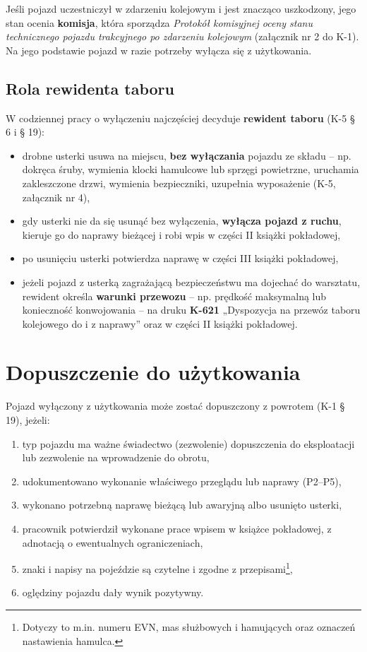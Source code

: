Jeśli pojazd uczestniczył w zdarzeniu kolejowym i jest znacząco uszkodzony, jego stan ocenia \textbf{komisja}, która sporządza \textit{Protokół komisyjnej oceny stanu technicznego pojazdu trakcyjnego po zdarzeniu kolejowym} (załącznik nr 2 do K-1). Na jego podstawie pojazd w razie potrzeby wyłącza się z użytkowania.

\subsection*{Rola rewidenta taboru}

W codziennej pracy o wyłączeniu najczęściej decyduje \textbf{rewident taboru} (K-5 § 6 i § 19):
\begin{itemize}
	\item drobne usterki usuwa na miejscu, \textbf{bez wyłączania} pojazdu ze składu – np. dokręca śruby, wymienia klocki hamulcowe lub sprzęgi powietrzne, uruchamia zakleszczone drzwi, wymienia bezpieczniki, uzupełnia wyposażenie (K-5, załącznik nr 4),
	\item gdy usterki nie da się usunąć bez wyłączenia, \textbf{wyłącza pojazd z ruchu}, kieruje go do naprawy bieżącej i robi wpis w części II książki pokładowej,
	\item po usunięciu usterki potwierdza naprawę w części III książki pokładowej,
	\item jeżeli pojazd z usterką zagrażającą bezpieczeństwu ma dojechać do warsztatu, rewident określa \textbf{warunki przewozu} – np. prędkość maksymalną lub konieczność konwojowania – na druku \textbf{K-621} „Dyspozycja na przewóz taboru kolejowego do i z naprawy” oraz w części II książki pokładowej.
\end{itemize}

\section{Dopuszczenie do użytkowania}

Pojazd wyłączony z użytkowania może zostać dopuszczony z powrotem (K-1 § 19), jeżeli:
\begin{enumerate}
	\item typ pojazdu ma ważne świadectwo (zezwolenie) dopuszczenia do eksploatacji lub zezwolenie na wprowadzenie do obrotu,
	\item udokumentowano wykonanie właściwego przeglądu lub naprawy (P2–P5),
	\item wykonano potrzebną naprawę bieżącą lub awaryjną albo usunięto usterki,
	\item pracownik potwierdził wykonane prace wpisem w książce pokładowej, z adnotacją o ewentualnych ograniczeniach,
	\item znaki i napisy na pojeździe są czytelne i zgodne z przepisami\footnote{Dotyczy to m.in. numeru EVN, mas służbowych i hamujących oraz oznaczeń nastawienia hamulca.},
	\item oględziny pojazdu dały wynik pozytywny.
\end{enumerate}

